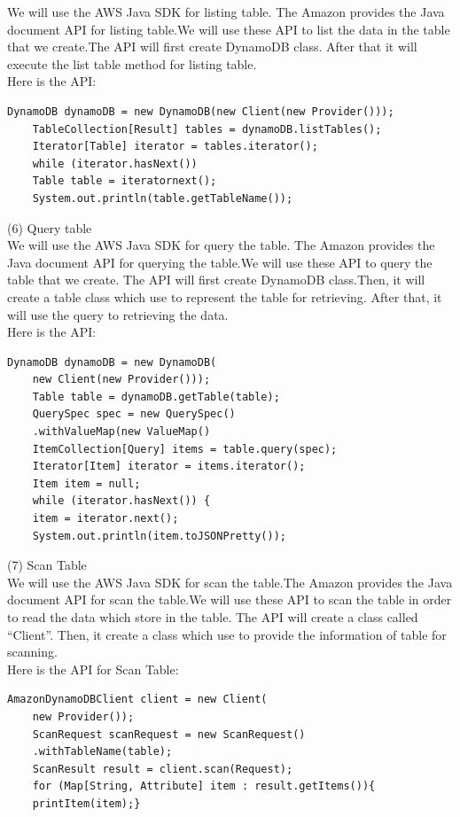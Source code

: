     We will use the AWS Java SDK for listing table. The Amazon provides the Java document API for listing table.We will use these API to list the data in the table that we create.The API will first create DynamoDB class. After that it will execute the list table method for listing table.\\
    Here is the API\cite{w1}:\\
     \begin{lstlisting}[caption=API for list table]
    DynamoDB dynamoDB = new DynamoDB(new Client(new Provider()));
    TableCollection[Result] tables = dynamoDB.listTables();
    Iterator[Table] iterator = tables.iterator();
    while (iterator.hasNext()) 
    Table table = iteratornext();
    System.out.println(table.getTableName());
    \end{lstlisting}
    (6) Query table \\
    We will use the AWS Java SDK for query the table. The Amazon provides the Java document API for querying the table.We will use these API to query the table that we create. The API will first create DynamoDB class.Then, it will create a table class which use to represent the table for retrieving. After that, it will use the query to retrieving the data.\\
    Here is the API\cite{w2}:
      \begin{lstlisting}[caption=API for query table]
    DynamoDB dynamoDB = new DynamoDB(
    new Client(new Provider()));
    Table table = dynamoDB.getTable(table);
    QuerySpec spec = new QuerySpec()
    .withValueMap(new ValueMap()
    ItemCollection[Query] items = table.query(spec);
    Iterator[Item] iterator = items.iterator();
    Item item = null;
    while (iterator.hasNext()) {
    item = iterator.next();
    System.out.println(item.toJSONPretty());
	\end{lstlisting}
    (7) Scan Table \\
    We will use the AWS Java SDK for scan the table.The Amazon provides the Java document API for scan the table.We will use these API to scan the table in order to read the data which store in the table. The API will create a class called “Client”. Then, it create a class which use to provide the information of table for scanning.\\
    Here is the API for Scan Table\cite{w3}:
      \begin{lstlisting}[caption=API for scan table]
    AmazonDynamoDBClient client = new Client(
    new Provider());
    ScanRequest scanRequest = new ScanRequest()
    .withTableName(table);
    ScanResult result = client.scan(Request);
    for (Map[String, Attribute] item : result.getItems()){
    printItem(item);}
    \end{lstlisting}

